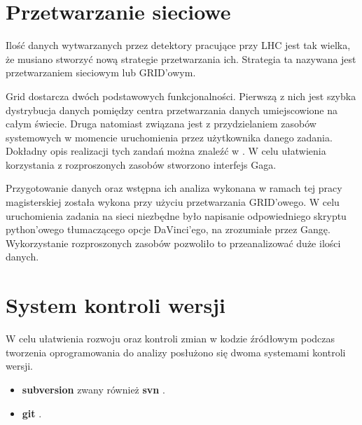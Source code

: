 \section{Przetwarzanie sieciowe}
Ilość danych wytwarzanych przez detektory pracujące przy LHC jest tak wielka, że musiano stworzyć nową strategie przetwarzania ich. Strategia ta nazywana jest przetwarzaniem sieciowym lub GRID'owym. 

Grid dostarcza dwóch podstawowych funkcjonalności. Pierwszą z nich jest szybka dystrybucja danych pomiędzy centra przetwarzania danych umiejscowione na całym świecie. Druga natomiast związana jest z przydzielaniem zasobów systemowych w momencie uruchomienia przez użytkownika danego zadania. Dokładny opis realizacji tych zandań można znaleźć w \cite{Grid}.  W celu ułatwienia korzystania z rozproszonych zasobów stworzono interfejs Gaga\citep{Ganga}.

Przygotowanie danych oraz wstępna ich  analiza wykonana w ramach tej pracy magisterskiej została wykona przy użyciu przetwarzania GRID'owego. W celu uruchomienia zadania na sieci niezbędne było napisanie odpowiedniego skryptu python'owego tłumaczącego opcje DaVinci'ego, na zrozumiałe przez Gangę. Wykorzystanie rozproszonych zasobów pozwoliło to przeanalizować duże ilości danych. 

\section{System kontroli wersji}
W celu ułatwienia rozwoju oraz kontroli zmian w kodzie źródłowym podczas tworzenia oprogramowania do analizy posłużono się dwoma systemami kontroli wersji.
\begin{itemize}
\item \textbf{subversion} zwany również \textbf{svn} \cite{svn}.
\item \textbf{git} \cite{git}.
\end{itemize} 

